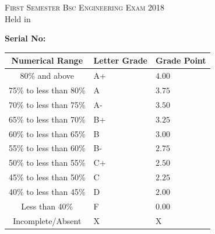 \documentclass[11pt]{article}
\begin{document}
\begin{table}[ht]
\begin{minipage}[b]{0.35\textwidth}
                \smallskip
                \textsc{First Semester Bsc Engineering Exam 2018}\\
                {Held in }\\
                \end{minipage}
                \hspace{0.2cm}
                \begin{minipage}[m]{0.3\linewidth} \flushright
                \vspace*{-1.5in}  
                {\flushright \bf	Serial No:\sl \\}
                \vspace{4mm}
                \begin{small}
                \renewcommand{\arraystretch}{1.01}
                \begin{tabular}{ |c|>{\centering}m{0.9cm}|m{0.91cm}|} 
                    \hline {\bf Numerical Range} & {\bf Letter Grade} & {\bf Grade Point} \\
                \hline   80\% and above & A+ & $4.00$  \\ 
                \hline   75\% to less than 80\% &  A & $3.75$\\ 
                \hline   70\% to less than 75\% &  A- & $3.50$ \\ 
                \hline   65\% to less than 70\% &  B+ & $3.25$\\ 
                \hline   60\% to less than 65\% &  B  & $3.00$\\ 
                \hline   55\% to less than 60\% &  B- & $2.75$\\ 
                \hline   50\% to less than 55\% &  C+ & $2.50$\\ 
                \hline   45\% to less than 50\% &  C  & $2.25$\\
                \hline   40\% to less than 45\% &  D  & $2.00$\\
                \hline   Less than 40\%         &  F  & $0.00$\\ 
                \hline   Incomplete/Absent         &  X  & X\\ 
                \hline 
                
                \end{tabular}
                \end{small} 
                \end{minipage}
                \end{table}
                \vspace*{-0.5cm}
\end{document}

